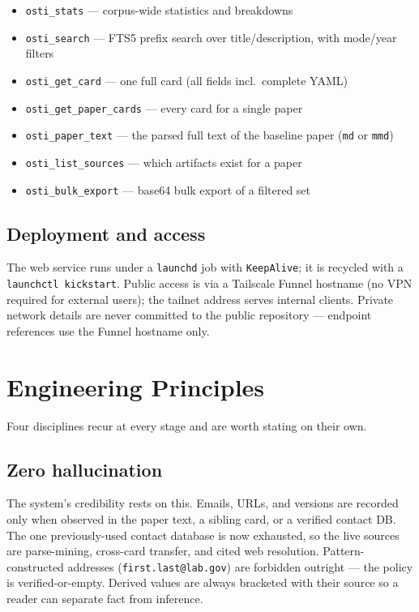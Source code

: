 \documentclass[11pt,letterpaper]{article}
\newcommand{\code}[1]{\texttt{\small #1}}
\begin{document}
\begin{itemize}[noitemsep,topsep=2pt]
\item \code{osti\_stats} --- corpus-wide statistics and breakdowns
\item \code{osti\_search} --- FTS5 prefix search over title/description, with
  mode/year filters
\item \code{osti\_get\_card} --- one full card (all fields incl.\ complete YAML)
\item \code{osti\_get\_paper\_cards} --- every card for a single paper
\item \code{osti\_paper\_text} --- the parsed full text of the baseline paper
  (\code{md} or \code{mmd})
\item \code{osti\_list\_sources} --- which artifacts exist for a paper
\item \code{osti\_bulk\_export} --- base64 bulk export of a filtered set
\end{itemize}

\subsection{Deployment and access}

The web service runs under a \code{launchd} job with \code{KeepAlive}; it is recycled
with a \code{launchctl kickstart}. Public access is via a Tailscale Funnel hostname
(no VPN required for external users); the tailnet address serves internal clients.
Private network details are never committed to the public repository --- endpoint
references use the Funnel hostname only.

\clearpage
\section{Engineering Principles}
\label{sec:engineering}

Four disciplines recur at every stage and are worth stating on their own.

\subsection{Zero hallucination}

The system's credibility rests on this. Emails, URLs, and versions are recorded only
when observed in the paper text, a sibling card, or a verified contact DB. The one
previously-used contact database is now exhausted, so the live sources are
parse-mining, cross-card transfer, and cited web resolution. Pattern-constructed
addresses (\code{first.last@lab.gov}) are forbidden outright --- the policy is
verified-or-empty. Derived values are always bracketed with their source so a reader
can separate fact from inference.
\end{document}

